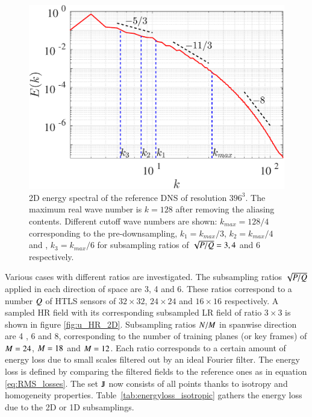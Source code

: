 \begin{figure}[t]
	\centering
	\includegraphics[width=0.65\columnwidth]{./images/datstats/isotropic/spectrum2d_DNS.eps}
	\caption{\label{fig:spectrum2d_DNS} 2D energy spectral of the reference DNS of resolution $ 396^3 $. The maximum real wave number is $ k=128 $ after removing the aliasing contents. Different cutoff wave numbers are shown: $ k_{max} =128/4$ corresponding to the pre-downsampling,  $ k_1 = k_{max}/3 $,  $ k_2 = k_{max}/4 $ and ,  $ k_3 = k_{max}/6 $ for subsampling ratios of $ \sqrt{P /Q }=3,4 $ and $ 6 $ respectively.}
\end{figure}

Various cases with different ratios are investigated. The subsampling ratios $ \sqrt{P /Q } $ applied in each direction of space are 3, 4 and 6. These ratios correspond to a number $ Q  $ of HTLS sensors  of $ 32 \times 32 $, $ 24 \times 24 $ and $ 16 \times 16 $ respectively. A sampled HR field with its corresponding subsampled LR field of ratio $ 3 \times 3 $ is shown in figure \ref{fig:u_HR_2D}. Subsampling ratios $ N/M $ in spanwise direction are 4 , 6 and 8, corresponding to the number of training planes (or key frames) of $ M =24 $, $ M =18 $ and $ M =12 $. Each ratio corresponds to a certain amount of energy loss due to small scales filtered out by an ideal Fourier filter. The energy loss is defined by comparing the filtered fields to the reference ones as in equation \ref{eq:RMS_losses}. The set $ \varmathbb{J}$ now consists of all points thanks to isotropy and homogeneity properties. Table~\ref{tab:energyloss_isotropic} gathers the energy loss due to the 2D or 1D subsamplings.

